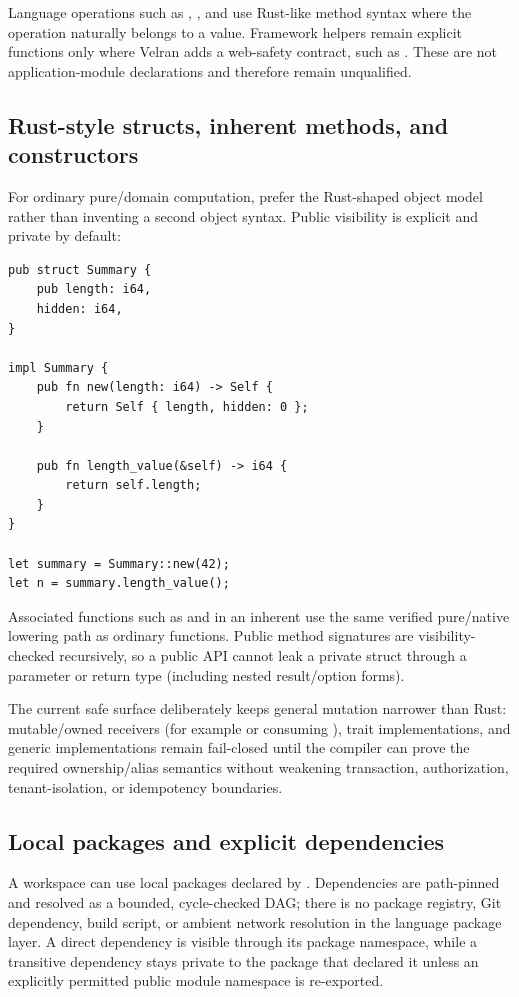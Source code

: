 Language operations such as , , and  use Rust-like method syntax where the operation naturally belongs to a value. Framework helpers remain explicit functions only where Velran adds a web-safety contract, such as . These are not application-module declarations and therefore remain unqualified.


\subsection*{Rust-style structs, inherent methods, and constructors}

For ordinary pure/domain computation, prefer the Rust-shaped object model rather than inventing a second object syntax. Public visibility is explicit and private by default:

\begin{lstlisting}[language=Velran]
pub struct Summary {
    pub length: i64,
    hidden: i64,
}

impl Summary {
    pub fn new(length: i64) -> Self {
        return Self { length, hidden: 0 };
    }

    pub fn length_value(&self) -> i64 {
        return self.length;
    }
}

let summary = Summary::new(42);
let n = summary.length_value();
\end{lstlisting}

Associated functions such as  and  in an inherent  use the same verified pure/native lowering path as ordinary functions. Public method signatures are visibility-checked recursively, so a public API cannot leak a private struct through a parameter or return type (including nested result/option forms).

The current safe surface deliberately keeps general mutation narrower than Rust: mutable/owned receivers (for example  or consuming ), trait implementations, and generic implementations remain fail-closed until the compiler can prove the required ownership/alias semantics without weakening transaction, authorization, tenant-isolation, or idempotency boundaries.

\subsection*{Local packages and explicit dependencies}

A workspace can use local packages declared by . Dependencies are path-pinned and resolved as a bounded, cycle-checked DAG; there is no package registry, Git dependency, build script, or ambient network resolution in the language package layer. A direct dependency is visible through its package namespace, while a transitive dependency stays private to the package that declared it unless an explicitly permitted public module namespace is re-exported.

